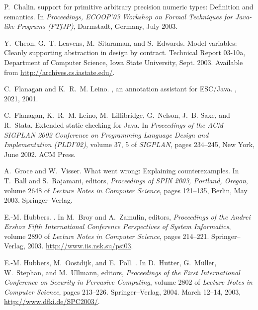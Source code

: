 \documentclass{sig-alternate}
\begin{document}
\begin{thebibliography}{10}
P.~Chalin.
 support for primitive arbitrary precision numeric types:
  Definition and semantics.
\newblock In {\em Proceedings, {ECOOP'03} Workshop on Formal Techniques for
  Java-like Programs ({FTfJP})}, Darmstadt, Germany, July 2003.

Y.~Cheon, G.~T. Leavens, M.~Sitaraman, and S.~Edwards.
\newblock Model variables: Cleanly supporting abstraction in design by
  contract.
\newblock Technical Report 03-10a, Department of Computer Science, Iowa State
  University, Sept. 2003.
\newblock Available from \url{http://archives.cs.iastate.edu/}.

C.~Flanagan and K.~R.~M. Leino.
, an annotation assistant for {ESC/Java}.
, 2021, 2001.

C.~Flanagan, K.~R.~M. Leino, M.~Lillibridge, G.~Nelson, J.~B. Saxe, and
  R.~Stata.
\newblock Extended static checking for {Java}.
\newblock In {\em Proceedings of the {ACM} {SIGPLAN} 2002 Conference on
  Programming Language Design and Implementation ({PLDI}'02)}, volume 37, 5 of
  {\em SIGPLAN}, pages 234--245, New York, June 2002. ACM Press.

A.~Groce and W.~Visser.
\newblock What went wrong: Explaining counterexamples.
\newblock In T.~Ball and S.~Rajamani, editors, {\em Proceedings of SPIN 2003,
  Portland, Oregon}, volume 2648 of {\em Lecture Notes in Computer Science},
  pages 121--135, Berlin, May 2003. Springer--Verlag.

E.-M. Hubbers.
.
\newblock In M.~Broy and A.~Zamulin, editors, {\em {Proceedings of the Andrei
  Ershov Fifth International Conference Perspectives of System Informatics}},
  volume 2890 of {\em Lecture Notes in Computer Science}, pages 214--221.
  Springer--Verlag, 2003.
\newblock \url{http://www.iis.nsk.su/psi03}.

E.-M. Hubbers, M.~Oostdijk, and E.~Poll.
.
\newblock In D.~Hutter, G.~M{\"u}ller, W.~Stephan, and M.~Ullmann, editors,
  {\em {Proceedings of the First International Conference on Security in
  Pervasive Computing}}, volume 2802 of {\em Lecture Notes in Computer
  Science}, pages 213--226. Springer--Verlag, 2004.
\newblock March 12--14, 2003, \url{http://www.dfki.de/SPC2003/}.


\end{thebibliography}
\end{document}
